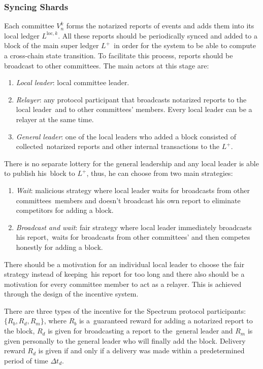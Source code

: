 \subsubsection{Syncing Shards}\label{subsubsec:syncing-shards}

Each committee $V_n^k$ forms the notarized reports of events and adds them into its local ledger $L^{\text{loc}, k}$.
All these reports should be periodically synced and added to a block of the main super ledger $L^+$\
in order for the system to be able to compute a cross-chain state transition.
To facilitate this process, reports should be broadcast to other committees.
The main actors at this stage are:
\begin{enumerate}
    \item \emph{Local leader}: local committee leader.
    \item \emph{Relayer}: any protocol participant that broadcasts notarized reports to the local leader\
    and to other committees' members.
    Every local leader can be a relayer at the same time.
    \item \emph{General leader}: one of the local leaders who added a block consisted of collected\
    notarized reports and other internal transactions to the $L^+$.
\end{enumerate}

There is no separate lottery for the general leadership and any local leader is able to publish his\
block to $L^+$, thus, he can choose from two main strategies:
\begin{enumerate}
    \item \emph{Wait}: malicious strategy where local leader waits for broadcasts from other committees\
    members and doesn't broadcast his own report to eliminate competitors for adding a block.
    \item \emph{Broadcast and wait}: fair strategy where local leader immediately broadcasts his report,\
    waits for broadcasts from other committees' and then competes honestly for adding a block.
\end{enumerate}
There should be a motivation for an individual local leader to choose the fair strategy instead of keeping\
his report for too long and there also should be a motivation for every committee member to act as a relayer.
This is achieved through the design of the incentive system.

There are three types of the incentive for the Spectrum protocol participants: ${\{R_b, R_d, R_m\}}$, where $R_b$ is a\
guaranteed reward for adding a notarized report to the block, $R_d$ is given for broadcasting a report to the\
general leader and $R_m$ is given personally to the general leader who will finally add the block.
Delivery reward $R_d$ is given if and only if a delivery was made within a predetermined period of time $\Delta t_d$.

